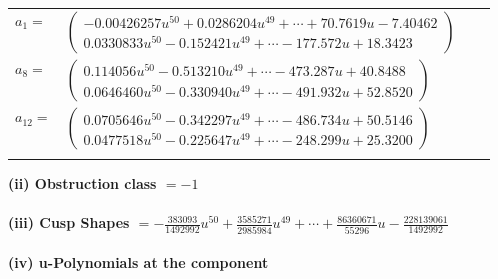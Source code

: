 \documentclass[1p]{elsarticle_modified}
\theoremstyle{definition}
\begin{document}
\begin{tabular}{m{7pt} m{180pt} m{7pt} m{180pt} }
\flushright $a_{1}=$&$\begin{pmatrix}-0.00426257 u^{50}+0.0286204 u^{49}+\cdots+70.7619 u-7.40462\\0.0330833 u^{50}-0.152421 u^{49}+\cdots-177.572 u+18.3423\end{pmatrix}$ \\
\flushright $a_{8}=$&$\begin{pmatrix}0.114056 u^{50}-0.513210 u^{49}+\cdots-473.287 u+40.8488\\0.0646460 u^{50}-0.330940 u^{49}+\cdots-491.932 u+52.8520\end{pmatrix}$ \\
\flushright $a_{12}=$&$\begin{pmatrix}0.0705646 u^{50}-0.342297 u^{49}+\cdots-486.734 u+50.5146\\0.0477518 u^{50}-0.225647 u^{49}+\cdots-248.299 u+25.3200\end{pmatrix}$\\&\end{tabular}
\flushleft \textbf{(ii) Obstruction class $= -1$}\\~\\
\flushleft \textbf{(iii) Cusp Shapes $= -\frac{383093}{1492992} u^{50}+\frac{3585271}{2985984} u^{49}+\cdots+\frac{86360671}{55296} u-\frac{228139061}{1492992}$}\\~\\
\newpage\renewcommand{\arraystretch}{1}
\flushleft \textbf{(iv) u-Polynomials at the component}\newline \\
\end{document}
